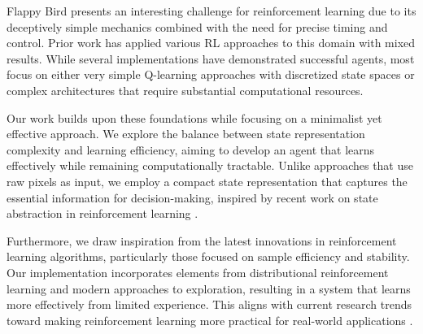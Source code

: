 Flappy Bird presents an interesting challenge for reinforcement learning due to its deceptively simple mechanics combined with the need for precise timing and control. Prior work has applied various RL approaches to this domain with mixed results. While several implementations have demonstrated successful agents, most focus on either very simple Q-learning approaches with discretized state spaces or complex architectures that require substantial computational resources.

Our work builds upon these foundations while focusing on a minimalist yet effective approach. We explore the balance between state representation complexity and learning efficiency, aiming to develop an agent that learns effectively while remaining computationally tractable. Unlike approaches that use raw pixels as input, we employ a compact state representation that captures the essential information for decision-making, inspired by recent work on state abstraction in reinforcement learning \cite{lee2022multi}.

Furthermore, we draw inspiration from the latest innovations in reinforcement learning algorithms, particularly those focused on sample efficiency and stability. Our implementation incorporates elements from distributional reinforcement learning and modern approaches to exploration, resulting in a system that learns more effectively from limited experience. This aligns with current research trends toward making reinforcement learning more practical for real-world applications \cite{wang2022offline}.